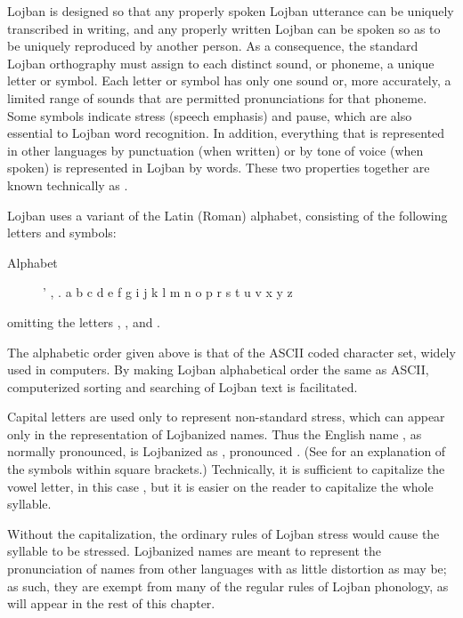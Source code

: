 Lojban is designed so that any properly spoken Lojban utterance can be uniquely transcribed in writing, and any properly written Lojban can be spoken so as to be uniquely reproduced by another person. As a consequence, the standard Lojban orthography must assign to each distinct sound, or phoneme, a unique letter or symbol. Each letter or symbol has only one sound or, more accurately, a limited range of sounds that are permitted pronunciations for that phoneme. Some symbols indicate stress (speech emphasis) and pause, which are also essential to Lojban word recognition. In addition, everything that is represented in other languages by punctuation (when written) or by tone of voice (when spoken) is represented in Lojban by words. These two properties together are known technically as .

Lojban uses a variant of the Latin (Roman) alphabet, consisting of the following letters and symbols:
\begin{description}
\item[Alphabet] ' , . a b c d e f g i j k l m n o p r s t u v x y z
\end{description}

{\noindent}omitting the letters , , and . 

The alphabetic order given above is that of the ASCII coded character set, widely used in computers. By making Lojban alphabetical order the same as ASCII, computerized sorting and searching of Lojban text is facilitated.

Capital letters are used only to represent non-standard stress, which can appear only in the representation of Lojbanized names. Thus the English name , as normally pronounced, is Lojbanized as , pronounced . (See  for an explanation of the symbols within square brackets.) Technically, it is sufficient to capitalize the vowel letter, in this case , but it is easier on the reader to capitalize the whole syllable.

Without the capitalization, the ordinary rules of Lojban stress would cause the  syllable to be stressed. Lojbanized names are meant to represent the pronunciation of names from other languages with as little distortion as may be; as such, they are exempt from many of the regular rules of Lojban phonology, as will appear in the rest of this chapter.



